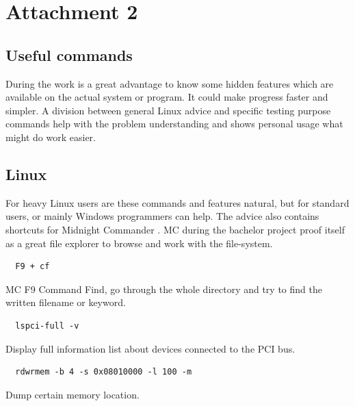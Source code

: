 \documentclass{ctuthesis}
\begin{document}
\chapter{Attachment 2}

 \section{Useful commands}
  During the work is a great advantage to know some hidden features which are available on the actual system or program. It could make progress faster and simpler. A division between general Linux advice and specific testing purpose commands help with the problem understanding and shows personal usage what might do work easier.
 \section{Linux}
  For heavy Linux users are these commands and features natural, but for standard users, or mainly Windows programmers can help. The advice also contains shortcuts for Midnight Commander \cite{mc}. MC during the bachelor project proof itself as a great file explorer to browse and work with the file-system.
  \begin{verbatim}  F9 + cf\end{verbatim}
  MC F9 Command Find, go through the whole directory and try to find the written filename or keyword.
  \begin{verbatim}  lspci-full -v\end{verbatim}
  Display full information list about devices connected to the PCI bus.
  \begin{verbatim}  rdwrmem -b 4 -s 0x08010000 -l 100 -m\end{verbatim}
  Dump certain memory location. \cite{rdwrmem}
 
\end{document}
